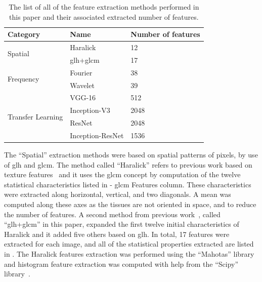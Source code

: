 \documentclass[journal,article,accept,moreauthors,pdftex, applsci]{Definitions/mdpi}
\begin{document}
\begin{table}[H]
    \centering
    \begin{tabular}{lll}
    \hline
    \textbf{Category}                   &  \textbf{Name}                & \textbf{Number of features}  \\ \hline
    \multirow{2}{*}{Spatial}            &  Haralick                     & 12                        \\ \cline{2-3} 
                                        &  \ac{glh}+\ac{glcm}           & 17                        \\ \hline 
    \multirow{2}{*}{Frequency}          &  Fourier                      & 38                        \\ \cline{2-3} 
                                        &  Wavelet                      & 39                        \\ \hline
    \multirow{4}{*}{Transfer Learning}  &  VGG-16                       & 512                       \\ \cline{2-3} 
                                        &  Inception-V3                 & 2048                      \\ \cline{2-3} 
                                        &  ResNet                       & 2048                      \\ \cline{2-3} 
                                        &  Inception-ResNet             & 1536                      \\ \hline
    \end{tabular}
    \caption{The list of all of the feature extraction methods performed in this paper and their associated extracted number of features.}
    \label{tab:features_methods}
\end{table}\par
The “Spatial” extraction methods were based on spatial patterns of pixels, by use of \ac{glh} and \ac{glcm}. The method called “Haralick” refers to previous work based on texture features~\cite{Haralick1973} and it uses the \ac{glcm} concept by computation of the twelve statistical characteristics listed in  - \ac{glcm} Features column. These characteristics were extracted along horizontal, vertical, and two diagonals. A mean was computed along these axes as the tissues are not oriented in space, and to reduce the number of features. A second method from previous work~\cite{Wiltgen2008}, called “\ac{glh}+\ac{glcm}” in this paper, expanded the first twelve initial characteristics of Haralick and it added five others based on \ac{glh}. In total, 17 features were extracted for each image, and all of the statistical properties extracted are listed in . The Haralick features extraction was performed using the “Mahotas” library~\cite{coelho2012mahotas} and histogram feature extraction was computed with help from the “Scipy” library~\cite{Jones2001}.\par
\end{document}
